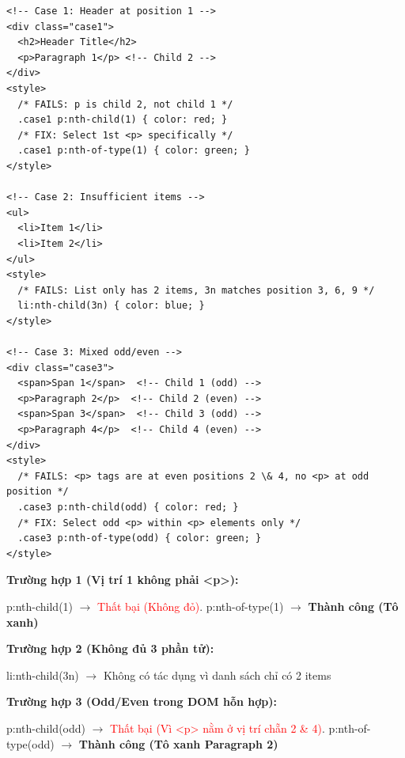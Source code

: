 \documentclass[11pt,oneside]{book}
\begin{document}
\begin{codeWindow}
\begin{lstlisting}[language=HTML5]
<!-- Case 1: Header at position 1 -->
<div class="case1">
  <h2>Header Title</h2>
  <p>Paragraph 1</p> <!-- Child 2 -->
</div>
<style>
  /* FAILS: p is child 2, not child 1 */
  .case1 p:nth-child(1) { color: red; }
  /* FIX: Select 1st <p> specifically */
  .case1 p:nth-of-type(1) { color: green; }
</style>

<!-- Case 2: Insufficient items -->
<ul>
  <li>Item 1</li>
  <li>Item 2</li>
</ul>
<style>
  /* FAILS: List only has 2 items, 3n matches position 3, 6, 9 */
  li:nth-child(3n) { color: blue; }
</style>

<!-- Case 3: Mixed odd/even -->
<div class="case3">
  <span>Span 1</span>  <!-- Child 1 (odd) -->
  <p>Paragraph 2</p>  <!-- Child 2 (even) -->
  <span>Span 3</span>  <!-- Child 3 (odd) -->
  <p>Paragraph 4</p>  <!-- Child 4 (even) -->
</div>
<style>
  /* FAILS: <p> tags are at even positions 2 \& 4, no <p> at odd position */
  .case3 p:nth-child(odd) { color: red; }
  /* FIX: Select odd <p> within <p> elements only */
  .case3 p:nth-of-type(odd) { color: green; }
</style>
\end{lstlisting}
\end{codeWindow}

\begin{browserWindow}
\sffamily\small
\textbf{Trường hợp 1 (Vị trí 1 không phải <p>):} \par\vspace{1pt}
\hspace{0.5em}p:nth-child(1) $\rightarrow$ \textcolor{red}{Thất bại (Không đỏ)}. p:nth-of-type(1) $\rightarrow$ \textcolor{green!70!black}{\textbf{Thành công (Tô xanh)}} \par\vspace{5pt}

\textbf{Trường hợp 2 (Không đủ 3 phần tử):} \par\vspace{1pt}
\hspace{0.5em}li:nth-child(3n) $\rightarrow$ \textcolor{gray!60}{Không có tác dụng vì danh sách chỉ có 2 items} \par\vspace{5pt}

\textbf{Trường hợp 3 (Odd/Even trong DOM hỗn hợp):} \par\vspace{1pt}
\hspace{0.5em}p:nth-child(odd) $\rightarrow$ \textcolor{red}{Thất bại (Vì <p> nằm ở vị trí chẵn 2 \& 4)}. p:nth-of-type(odd) $\rightarrow$ \textcolor{green!70!black}{\textbf{Thành công (Tô xanh Paragraph 2)}}
\end{browserWindow}
\end{document}
